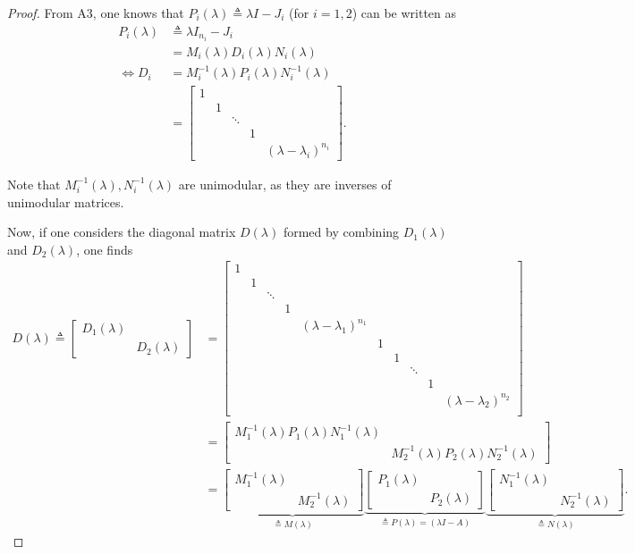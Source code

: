 \documentclass[11pt]{article}
\begin{document}
\begin{proof}
From A3, one knows that $P_i(\lambda) \triangleq \lambda I - J_i$ (for \(i = 1, 2\)) can be written as
\begin{align*}
P_i(\lambda) &\triangleq \lambda I_{n_i} - J_i\\
&= M_i(\lambda) D_i(\lambda) N_i(\lambda)\\
\iff D_i &= M_i^{-1}(\lambda)P_i(\lambda) N_i^{-1}(\lambda)\\
&= \begin{bmatrix}
1 & & & &\\
  &1& & &\\
  & &\ddots& &\\
  & & & 1& \\
  & & &  &(\lambda - \lambda_i)^{n_i}
\end{bmatrix}.
\end{align*}

Note that $M_i^{-1}(\lambda), N_i^{-1}(\lambda)$ are unimodular, as they are inverses of unimodular matrices.

Now, if one considers the diagonal matrix \(D(\lambda)\) formed by combining $D_1(\lambda)$ and $D_2(\lambda)$, one finds
\begin{align*}
D(\lambda) \triangleq
\begin{bmatrix}
D_1(\lambda) &\\
& D_2(\lambda)
\end{bmatrix} &= \begin{bmatrix}
1 & & & &&&&&\\
  &1& & &&&&&\\
  & &\ddots& &&&&&\\
  & & & 1& &&&&\\
  & & &  &(\lambda - \lambda_1)^{n_1}&&&&\\
  &&&&&1 & & & &\\
  &&&&&&1& & &\\
  &&&&&& &\ddots& &\\
  &&&&&& & & 1& \\
  &&&&&&& &  &(\lambda - \lambda_2)^{n_2}\\
\end{bmatrix}\\
&=\begin{bmatrix}
M_1^{-1}(\lambda)P_1(\lambda) N_1^{-1}(\lambda) &\\
& M_2^{-1}(\lambda)P_2(\lambda) N_2^{-1}(\lambda)
\end{bmatrix}\\
&=
\underbrace{\begin{bmatrix}
M_1^{-1}(\lambda) &\\
& M_2^{-1}(\lambda)
\end{bmatrix}}_{\triangleq M(\lambda)}
\underbrace{\begin{bmatrix}
P_1(\lambda) &\\
& P_2(\lambda)
\end{bmatrix}}_{\triangleq P(\lambda) = (\lambda I - A)}
\underbrace{\begin{bmatrix}
N_1^{-1}(\lambda) &\\
& N_2^{-1}(\lambda)
\end{bmatrix}}_{\triangleq N(\lambda)}.
\end{align*}


\end{proof}
\end{document}
